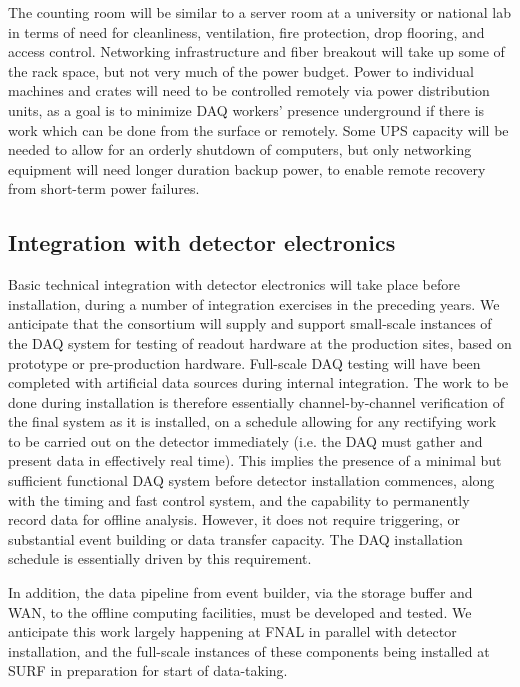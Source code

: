 The counting room will be similar to a server room at a university or national lab in terms of need for cleanliness, ventilation, fire protection, drop flooring, and access control. Networking infrastructure and fiber breakout will take up some of the rack space, but not very much of the power budget. Power to individual machines and crates will need to be controlled remotely via power distribution units, as a goal is to minimize DAQ workers' presence underground if there is work which can be done from the surface or remotely.  Some UPS capacity will be needed to allow for an orderly shutdown of computers, but only networking equipment will need longer duration backup power, to enable remote recovery from short-term power failures.  

\subsection{Integration with detector electronics}
\label{sec:fdsp-daq-install-transport}

Basic technical integration with detector electronics will take place before installation, during a number of integration exercises in the preceding years. We anticipate that the consortium will supply and support small-scale instances of the DAQ system for testing of readout hardware at the production sites, based on prototype or pre-production hardware. Full-scale DAQ testing will have been completed with artificial data sources during internal integration. The work to be done during installation is therefore essentially channel-by-channel verification of the final system as it is installed, on a schedule allowing for any rectifying work to be carried out on the detector immediately (i.e. the DAQ must gather and present data in effectively real time). This implies the presence of a minimal but sufficient functional DAQ system before detector installation commences, along with the timing and fast control system, and the capability to permanently record data for offline analysis. However, it does not require triggering, or substantial event building or data transfer capacity. The DAQ installation schedule is essentially driven by this requirement.

In addition, the data pipeline from event builder, via the storage buffer and WAN, to the offline computing facilities, must be developed and tested. We anticipate this work largely happening at FNAL in parallel with detector installation, and the full-scale instances of these components being installed at SURF in preparation for start of data-taking.

